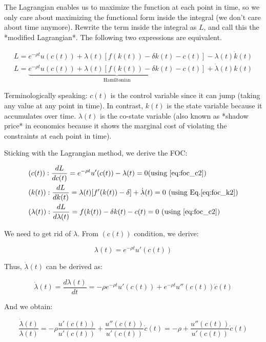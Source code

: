 \documentclass[11pt,a4paper]{book}
\theoremstyle{definition}\newtheorem{definition}{Definition}
\theoremstyle{definition}\newtheorem{fact}{Fact}
\theoremstyle{definition}\newtheorem{remark}{Remark}
\theoremstyle{definition}\newtheorem{ex}{Ex.}
\theoremstyle{definition}\newtheorem{project}{Project}
\theoremstyle{definition}\newtheorem{problem}{Problem}
\theoremstyle{definition}\newtheorem{example}{Example}
\numberwithin{theorem}{section}
\numberwithin{corollary}{chapter}
\numberwithin{assumption}{chapter}
\numberwithin{definition}{chapter}
\numberwithin{prop}{chapter}
\numberwithin{notation}{chapter}
\numberwithin{problem}{chapter}
\numberwithin{example}{chapter}
\numberwithin{fact}{chapter}
\numberwithin{ex}{chapter}
\begin{document}
The Lagrangian enables us to maximize the function at each point in time, so we only care about maximizing the functional form inside the integral (we don't care about time anymore). Rewrite the term inside the integral as $L$, and call this the *modified Lagrangian*. The following two expressions are equivalent.

\begin{align}
     L = {e^{-\rho t} u(c(t)) + \lambda(t) \left[ f( k(t)) - \delta k(t) - c(t)  \right]} -  \lambda(t)\dot{k}(t)     \label{eq:foc_c2} \\                            
     L =  \underbrace{e^{-\rho t} u(c(t)) + \lambda(t) \left[ f( k(t)) - \delta k(t) - c(t)  \right]}_{\text{Hamiltonian}}+  \dot{\lambda}(t)k(t)  \label{eq:foc_k2}
\end{align}

Terminologically speaking: $c(t)$ is the control variable since it can jump (taking any value at any point in time). In contrast, $k(t)$ is the state variable because it accumulates over time. ${\lambda}(t)$ is the co-state variable (also known as *shadow price* in economics because it shows the marginal cost of violating the constraints at each point in time). 

Sticking with the Lagrangian method, we derive the FOC:

\begin{align}
     &(c(t)): \frac{dL}{d c(t)} = e^{-\rho t} u'(c(t)) - \lambda(t) = 0  \text{(using \eqref{eq:foc_c2})}     \\   
     &(k(t)): \frac{dL}{d k(t)} = \lambda(t) [ f'(k(t)) - \delta] + \dot{\lambda}(t) = 0 \ \text{(using Eq.\eqref{eq:foc_k2})} \\
     &(\lambda(t)): \frac{dL}{d \lambda(t)} = f(k(t)) - \delta k(t) - c(t) = 0 \ \text{(using \eqref{eq:foc_c2})}           
\end{align}

We need to get rid of $\lambda$. From $(c(t))$ condition, we derive:

$$
    \lambda(t) = e^{-\rho t} u'(c(t))
$$

Thus, $\dot{\lambda}(t)$ can be derived as:

$$
    \dot{\lambda}(t) = \frac{d \lambda(t)}{dt} = -\rho e^{-\rho t} u'(c(t)) + e^{-\rho t} u''(c(t)) \dot{c}(t)
$$

And we obtain:

$$
    \frac{\dot{\lambda}(t)}{\lambda(t)} = -\rho \frac{u'(c(t))}{u'(c(t))} + \frac{u''(c(t))}{u'(c(t))}\dot{c}(t) = - \rho + \frac{u''(c(t))}{u'(c(t))}\dot{c}(t)
$$
\end{document}

